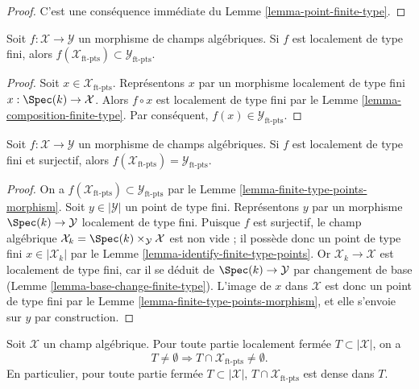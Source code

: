 \begin{proof}
C'est une conséquence immédiate du
Lemme \ref{lemma-point-finite-type}.
\end{proof}

\begin{lemma}
\label{lemma-finite-type-points-morphism}
Soit $f : \mathcal{X} \to \mathcal{Y}$ un morphisme de champs algébriques.
Si $f$ est localement de type fini, alors
$f(\mathcal{X}_{\text{ft-pts}}) \subset \mathcal{Y}_{\text{ft-pts}}$.
\end{lemma}

\begin{proof}
Soit $x \in \mathcal{X}_{\text{ft-pts}}$. Représentons $x$ par un morphisme
localement de type fini $x : \Spec(k) \to \mathcal{X}$. Alors
$f \circ x$ est localement de type fini par le
Lemme \ref{lemma-composition-finite-type}.
Par conséquent, $f(x) \in \mathcal{Y}_{\text{ft-pts}}$.
\end{proof}

\begin{lemma}
\label{lemma-finite-type-points-surjective-morphism}
Soit $f : \mathcal{X} \to \mathcal{Y}$ un morphisme de champs algébriques.
Si $f$ est localement de type fini et surjectif, alors
$f(\mathcal{X}_{\text{ft-pts}}) = \mathcal{Y}_{\text{ft-pts}}$.
\end{lemma}

\begin{proof}
On a $f(\mathcal{X}_{\text{ft-pts}}) \subset
\mathcal{Y}_{\text{ft-pts}}$ par le
Lemme \ref{lemma-finite-type-points-morphism}.
Soit $y \in |\mathcal{Y}|$ un point de type fini. Représentons $y$ par un
morphisme $\Spec(k) \to \mathcal{Y}$ localement de type fini.
Puisque $f$ est surjectif, le champ algébrique
$\mathcal{X}_k = \Spec(k) \times_\mathcal{Y} \mathcal{X}$ est non vide ; il
possède donc un point de type fini $x \in |\mathcal{X}_k|$ par le
Lemme \ref{lemma-identify-finite-type-points}.
Or $\mathcal{X}_k \to \mathcal{X}$ est localement de type fini, car il se
déduit de $\Spec(k) \to \mathcal{Y}$ par changement de base
(Lemme \ref{lemma-base-change-finite-type}).
L'image de $x$ dans $\mathcal{X}$ est donc un point de type fini par le
Lemme \ref{lemma-finite-type-points-morphism}, et elle s'envoie sur $y$ par
construction.
\end{proof}

\begin{lemma}
\label{lemma-enough-finite-type-points}
Soit $\mathcal{X}$ un champ algébrique.
Pour toute partie localement fermée $T \subset |\mathcal{X}|$, on a
$$
T \not = \emptyset
\Rightarrow
T \cap \mathcal{X}_{\text{ft-pts}} \not = \emptyset.
$$
En particulier, pour toute partie fermée $T \subset |\mathcal{X}|$,
$T \cap \mathcal{X}_{\text{ft-pts}}$ est dense dans $T$.
\end{lemma}

